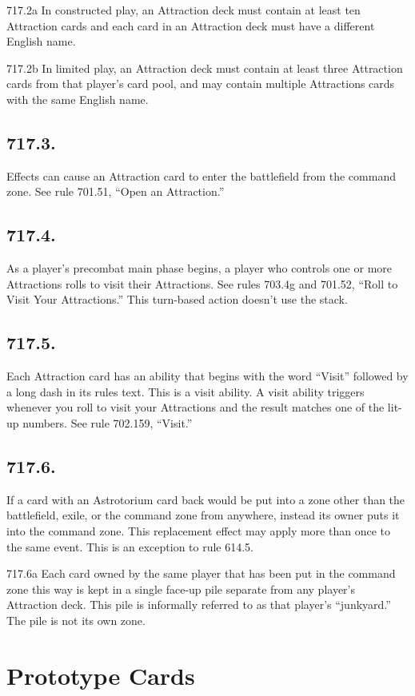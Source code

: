 717.2a In constructed play, an Attraction deck must contain at least ten Attraction cards and each card in an Attraction deck must have a different English name.

717.2b In limited play, an Attraction deck must contain at least three Attraction cards from that player’s card pool, and may contain multiple Attractions cards with the same English name.

\subsection*{717.3.}
Effects can cause an Attraction card to enter the battlefield from the command zone. See rule 701.51, “Open an Attraction.”

\subsection*{717.4.}
As a player’s precombat main phase begins, a player who controls one or more Attractions rolls to visit their Attractions. See rules 703.4g and 701.52, “Roll to Visit Your Attractions.” This turn-based action doesn’t use the stack.

\subsection*{717.5.}
Each Attraction card has an ability that begins with the word “Visit” followed by a long dash in its rules text. This is a visit ability. A visit ability triggers whenever you roll to visit your Attractions and the result matches one of the lit-up numbers. See rule 702.159, “Visit.”

\subsection*{717.6.}
If a card with an Astrotorium card back would be put into a zone other than the battlefield, exile, or the command zone from anywhere, instead its owner puts it into the command zone. This replacement effect may apply more than once to the same event. This is an exception to rule 614.5.

717.6a Each card owned by the same player that has been put in the command zone this way is kept in a single face-up pile separate from any player’s Attraction deck. This pile is informally referred to as that player’s “junkyard.” The pile is not its own zone.

\section{Prototype Cards}
